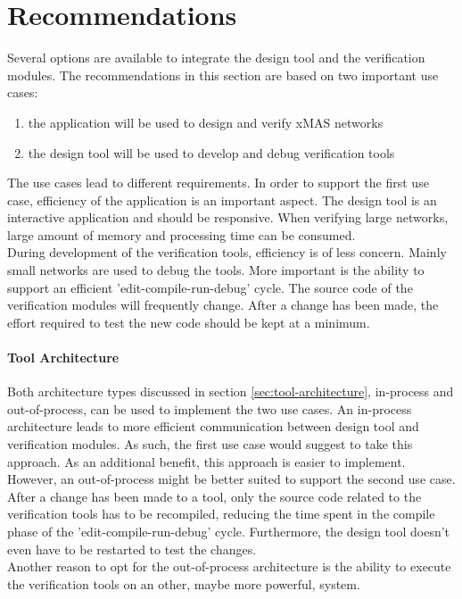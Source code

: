 \documentclass[a4paper,11pt]{article}
\begin{document}
\section{Recommendations}

Several options are available to integrate the design tool and the verification
modules. The recommendations in this section are based on two important use cases:
\begin{enumerate}
 \item the application will be used to design and verify xMAS networks
 \item the design tool will be used to develop and debug verification tools
\end{enumerate}

The use cases lead to different requirements. In order to support the first use case,
efficiency of the application is an important aspect. The design tool is an interactive
application and should be responsive. When verifying large networks, large amount of
memory and processing time can be consumed.\\
During development of the verification tools, efficiency is of less concern. Mainly
small networks are used to debug the tools. More important is the ability to support
an efficient 'edit-compile-run-debug' cycle. The source code of the verification
modules will frequently change. After a change has been made, the effort required to
test the new code should be kept at a minimum.

\paragraph{Tool Architecture}
Both architecture types discussed in section \ref{sec:tool-architecture}, in-process
and out-of-process, can be used to implement the two use cases. An in-process architecture
leads to more efficient communication between design tool and verification modules.
As such, the first use case would suggest to take this approach. As an additional
benefit, this approach is easier to implement.\\
However, an out-of-process might be better suited to support the second use case.
After a change has been made to a tool, only the source code related to the verification
tools has to be recompiled, reducing the time spent in the compile phase of the
'edit-compile-run-debug' cycle. Furthermore, the design tool doesn't even have to
be restarted to test the changes.\\
Another reason to opt for the out-of-process architecture is the ability to execute
the verification tools on an other, maybe more powerful, system.
\end{document}
